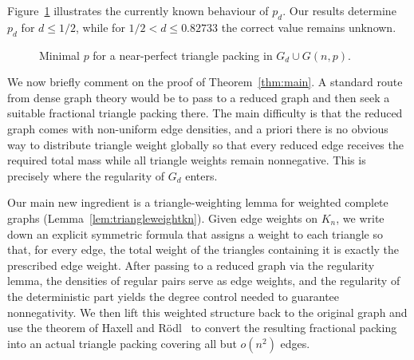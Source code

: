 \documentclass[11pt,reqno]{amsart}
\theoremstyle{definition}
\theoremstyle{remark}
\renewcommand\le{\leqslant}
\begin{document}
Figure~\ref{fig:slope} illustrates the currently known behaviour of $p_d$. Our results determine $p_d$ for $d\le 1/2$, while for $1/2<d\le 0.82733$ the correct value remains unknown. 

\begin{figure}[htbp]
\centering
{}
\caption{Minimal $p$ for a near-perfect triangle packing in $G_d\cup G(n,p)$.}\label{fig:slope}
\end{figure}

We now briefly comment on the proof of Theorem~\ref{thm:main}. A standard route from dense graph theory would be to pass to a reduced graph and then seek a suitable fractional triangle packing there. The main difficulty is that the reduced graph comes with non-uniform edge densities, and a priori there is no obvious way to distribute triangle weight globally so that every reduced edge receives the required total mass while all triangle weights remain nonnegative. This is precisely where the regularity of $G_d$ enters.

Our main new ingredient is a triangle-weighting lemma for weighted complete graphs (Lemma~\ref{lem:triangleweightkn}). Given edge weights on $K_n$, we write down an explicit symmetric formula that assigns a weight to each triangle so that, for every edge, the total weight of the triangles containing it is exactly the prescribed edge weight. After passing to a reduced graph via the regularity lemma, the densities of regular pairs serve as edge weights, and the regularity of the deterministic part yields the degree control needed to guarantee nonnegativity. We then lift this weighted structure back to the original graph and use the theorem of Haxell and R\"odl~\cite{HR} to convert the resulting fractional packing into an actual triangle packing covering all but $o(n^2)$ edges.
\end{document}
